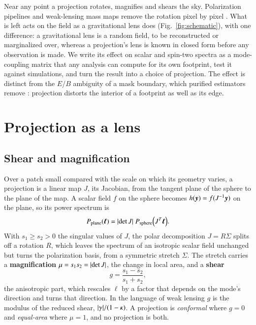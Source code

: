 \documentclass{aa}
\newcommand{\vbell}{\vb*{\ell}}
\begin{document}
Near any point a projection rotates, magnifies and shears the sky.
Polarization pipelines and weak-lensing mass maps remove the rotation pixel by pixel \citep{wallis17, pires20}.
What is left acts on the field as a gravitational lens does (Fig.~\ref{fig:schematic}), with one difference: a gravitational lens is a random field, to be reconstructed or marginalized over, whereas a projection's lens is known in closed form before any observation is made.
We write its effect on scalar and spin-two spectra as a mode-coupling matrix that any analysis can compute for its own footprint, test it against simulations, and turn the result into a choice of projection.
The effect is distinct from the $E$/$B$ ambiguity of a mask boundary, which purified estimators remove \citep{bunn03, smith07, alonso19}: projection distorts the interior of a footprint as well as its edge.

\section{Projection as a lens} \label{sec:law}

\subsection{Shear and magnification} \label{subsec:projections}

Over a patch small compared with the scale on which its geometry varies, a projection is a linear map $J$, its Jacobian, from the tangent plane of the sphere to the plane of the map.
A scalar field $f$ on the sphere becomes $h(\vb*{y}) = f(J^{-1}\vb*{y})$ on the plane, so its power spectrum is
\begin{equation} \label{eq:scalar_remap}
  P_{\rm plane}(\vbell) = \abs{\det J}\; P_{\rm sphere}\qty(J^{T}\vbell).
\end{equation}
With $s_1 \geq s_2 > 0$ the singular values of $J$, the polar decomposition $J = R\Sigma$ splits off a rotation $R$, which leaves the spectrum of an isotropic scalar field unchanged but turns the polarization basis, from a symmetric stretch $\Sigma$.
The stretch carries a \textbf{magnification} $\mu = s_1 s_2 = \abs{\det J}$, the change in local area, and a \textbf{shear}
\begin{equation} \label{eq:shear}
  g = \frac{s_1 - s_2}{s_1 + s_2},
\end{equation}
the anisotropic part, which rescales $\ell$ by a factor that depends on the mode's direction and turns that direction.
In the language of weak lensing $g$ is the modulus of the reduced shear, $\abs{\gamma}/(1-\kappa)$.
A projection is \textit{conformal} where $g = 0$ and \textit{equal-area} where $\mu = 1$, and no projection is both.
\end{document}
